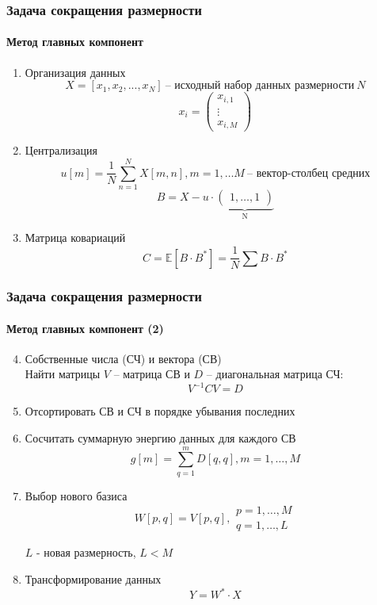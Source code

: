 \documentclass[xcolor=table]{beamer}
\begin{document}
\begin{frame}
  \frametitle{Задача сокращения размерности}
  \framesubtitle{Метод главных компонент}

  \begin{enumerate}
    \item Организация данных
      \[ X = [x_1, x_2, ..., x_N]~\text{-- исходный набор данных размерности}~N\]
      \[x_i = \begin{pmatrix} x_{i,1} \\ \vdots \\ x_{i, M} \end{pmatrix} \]
    \item Централизация
      \[ u[m] = \frac{1}{N}\sum_{n=1}^{N}X[m,n], m = 1, \dots M ~\text{-- вектор-столбец средних} \]
      \[ B = X - u \cdot \underbrace{\begin{pmatrix} 1, \dots, 1 \end{pmatrix}}_\text{N} \]
    \item Матрица ковариаций
      \[ C = \mathbb{E}[B \cdot B^*] = \frac{1}{N} \sum B \cdot B^*\]
  \end{enumerate}
\end{frame}

\begin{frame}
  \frametitle{Задача сокращения размерности}
  \framesubtitle{Метод главных компонент (2)}

  \begin{enumerate}
    \setcounter{enumi}{3}
    \item Собственные числа (СЧ) и вектора (СВ) \\
      Найти матрицы $V$ -- матрица СВ и $D$ -- диагональная матрица СЧ:
      \[V^{-1}CV = D\]
    \item Отсортировать СВ и СЧ в порядке убывания последних
    \item Сосчитать суммарную энергию данных для каждого СВ
      \vspace{-5pt}
      \[g[m] = \sum_{q=1}^m D[q, q], m = 1,\dots,M \]
      \vspace{-5pt}
    \item Выбор нового базиса
      \[W[p, q] = V[p, q], \begin{array} {l} p = 1, \dots, M \\ q = 1, \dots, L \end{array} \]
      \begin{center}$L$ - новая размерность, $L < M$ \end{center}
    \item Трансформирование данных
      \[Y = W^* \cdot X \]
  \end{enumerate}
\end{frame}
\end{document}
